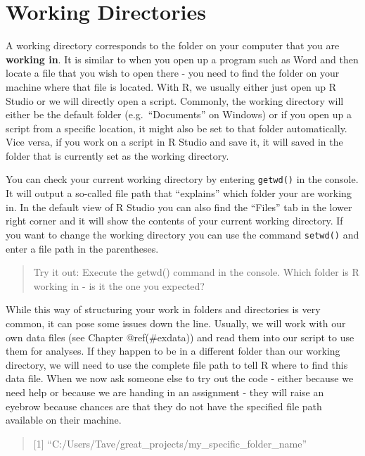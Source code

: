 \documentclass[
]{book}
\begin{document}
\section{Working Directories}\label{working-directories}

A working directory corresponds to the folder on your computer that you are \textbf{working in}.
It is similar to when you open up a program such as Word and then locate a file that you wish to open there - you need to find the folder on your machine where that file is located.
With R, we usually either just open up R Studio or we will directly open a script.
Commonly, the working directory will either be the default folder (e.g.~``Documents'' on Windows) or if you open up a script from a specific location, it might also be set to that folder automatically.
Vice versa, if you work on a script in R Studio and save it, it will saved in the folder that is currently set as the working directory.

You can check your current working directory by entering \texttt{getwd()} in the console.
It will output a so-called file path that ``explains'' which folder your are working in.
In the default view of R Studio you can also find the ``Files'' tab in the lower right corner and it will show the contents of your current working directory.
If you want to change the working directory you can use the command \texttt{setwd()} and enter a file path in the parentheses.

\begin{quote}
Try it out: Execute the getwd() command in the console.
Which folder is R working in - is it the one you expected?
\end{quote}

While this way of structuring your work in folders and directories is very common, it can pose some issues down the line.
Usually, we will work with our own data files (see Chapter @ref(\#exdata)) and read them into our script to use them for analyses.
If they happen to be in a different folder than our working directory, we will need to use the complete file path to tell R where to find this data file.
When we now ask someone else to try out the code - either because we need help or because we are handing in an assignment - they will raise an eyebrow because chances are that they do not have the specified file path available on their machine.

\begin{quote}
{[}1{]} ``C:/Users/Tave/great\_projects/my\_specific\_folder\_name''
\end{quote}
\end{document}
